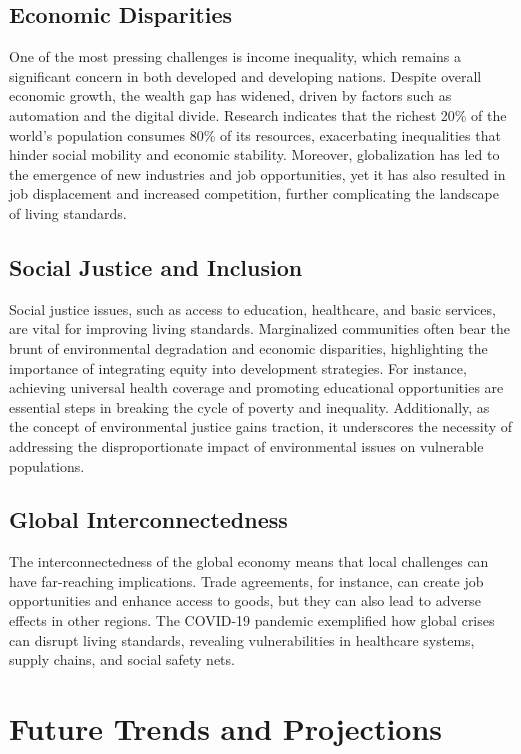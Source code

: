 \documentclass[12pt]{article}
\begin{document}
\subsection{Economic Disparities}
One of the most pressing challenges is income inequality, which remains a significant
concern in both developed and developing nations. Despite overall economic
growth, the wealth gap has widened, driven by factors such as automation and
the digital divide. Research indicates that the richest 20\% of the world's population
consumes 80\% of its resources, exacerbating inequalities that hinder social mobility
and economic stability. Moreover, globalization has led to the emergence of
new industries and job opportunities, yet it has also resulted in job displacement and
increased competition, further complicating the landscape of living standards.

\subsection{Social Justice and Inclusion}
Social justice issues, such as access to education, healthcare, and basic services,
are vital for improving living standards. Marginalized communities often bear the brunt
of environmental degradation and economic disparities, highlighting the importance
of integrating equity into development strategies. For instance, achieving universal
health coverage and promoting educational opportunities are essential steps in
breaking the cycle of poverty and inequality.  Additionally, as the concept of
environmental justice gains traction, it underscores the necessity of addressing the
disproportionate impact of environmental issues on vulnerable populations.

\subsection{Global Interconnectedness}
The interconnectedness of the global economy means that local challenges can have
far-reaching implications. Trade agreements, for instance, can create job opportunities
and enhance access to goods, but they can also lead to adverse effects in other
regions.  The COVID-19 pandemic exemplified how global crises can disrupt
living standards, revealing vulnerabilities in healthcare systems, supply chains, and
social safety nets.

\section{Future Trends and Projections}
\end{document}
